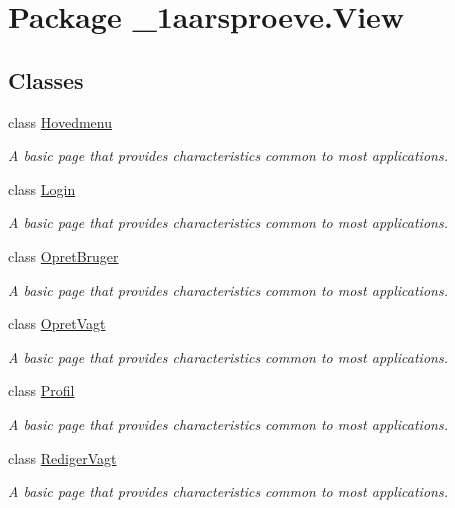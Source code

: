 \hypertarget{namespace__1aarsproeve_1_1_view}{}\section{Package \+\_\+1aarsproeve.\+View}
\label{namespace__1aarsproeve_1_1_view}
\subsection*{Classes}
\begin{DoxyCompactItemize}
\item 
class \hyperlink{class__1aarsproeve_1_1_view_1_1_hovedmenu}{Hovedmenu}
\begin{DoxyCompactList}\small\item\em A basic page that provides characteristics common to most applications. \end{DoxyCompactList}\item 
class \hyperlink{class__1aarsproeve_1_1_view_1_1_login}{Login}
\begin{DoxyCompactList}\small\item\em A basic page that provides characteristics common to most applications. \end{DoxyCompactList}\item 
class \hyperlink{class__1aarsproeve_1_1_view_1_1_opret_bruger}{Opret\+Bruger}
\begin{DoxyCompactList}\small\item\em A basic page that provides characteristics common to most applications. \end{DoxyCompactList}\item 
class \hyperlink{class__1aarsproeve_1_1_view_1_1_opret_vagt}{Opret\+Vagt}
\begin{DoxyCompactList}\small\item\em A basic page that provides characteristics common to most applications. \end{DoxyCompactList}\item 
class \hyperlink{class__1aarsproeve_1_1_view_1_1_profil}{Profil}
\begin{DoxyCompactList}\small\item\em A basic page that provides characteristics common to most applications. \end{DoxyCompactList}\item 
class \hyperlink{class__1aarsproeve_1_1_view_1_1_rediger_vagt}{Rediger\+Vagt}
\begin{DoxyCompactList}\small\item\em A basic page that provides characteristics common to most applications. \end{DoxyCompactList}\item 

\end{DoxyCompactItemize}
